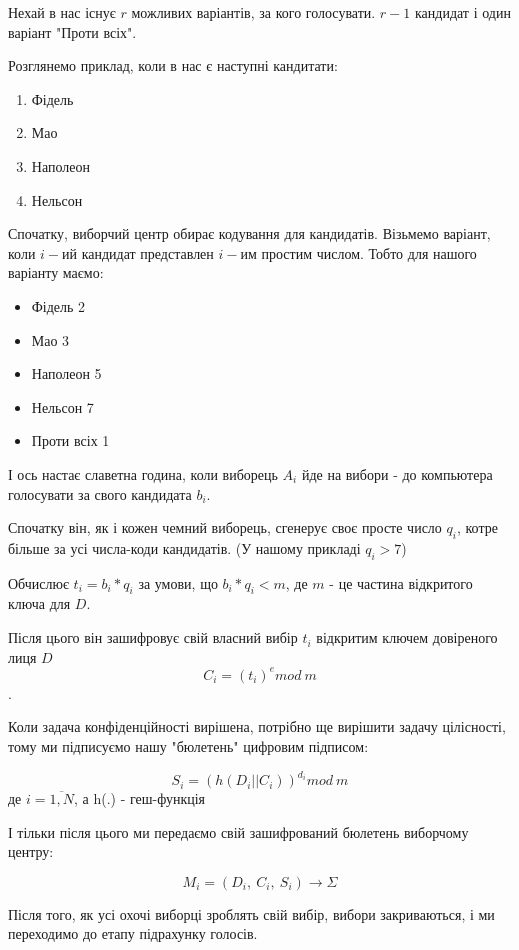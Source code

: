 Нехай в нас існує $r$ можливих варіантів, за кого голосувати. $r-1$ кандидат і один варіант "Проти всіх".

Розглянемо приклад, коли в нас є наступні кандитати:

\begin{enumerate}
    \item Фідель
    \item Мао
    \item Наполеон
    \item Нельсон
\end{enumerate}

Спочатку, виборчий центр обирає кодування для кандидатів. Візьмемо варіант, коли $i-ий$ кандидат
представлен $i-им$ простим числом. Тобто для нашого варіанту маємо:

\begin{itemize}
    \item Фідель 2
    \item Мао 3
    \item Наполеон 5
    \item Нельсон 7
    \item Проти всіх 1
\end{itemize}

І ось настає славетна година, коли виборець $A_i$ йде на вибори -
до компьютера голосувати за свого кандидата $b_i$. 

Спочатку він, як і кожен чемний виборець, сгенерує своє просте число $q_i$, котре більше за 
усі числа-коди кандидатів. (У нашому прикладі $q_i>7$)

Обчислює $t_i=b_i*q_i$ за умови, що $b_i*q_i<m$, де $m$ - це частина відкритого ключа для $D$.

Після цього він зашифровує свій власний вибір $t_i$ відкритим ключем довіреного лиця $D$
\[ C_i = (t_i)^e mod\ m \].

Коли задача конфіденційності вирішена, потрібно ще вирішити задачу цілісності, тому ми підписуємо 
нашу "бюлетень" цифровим підписом:

\[ S_i = (h(D_i || C_i))^{d_i} mod \ m \] 
де $i = \overline{1,N}$, а h(.) - геш-функція

І тільки після цього ми передаємо свій зашифрований бюлетень виборчому центру:

\[ M_i = (D_i,\ C_i,\ S_i) \rightarrow \Sigma\]  

Після того, як усі охочі виборці зроблять свій вибір, вибори закриваються, і ми переходимо до етапу 
підрахунку голосів.

